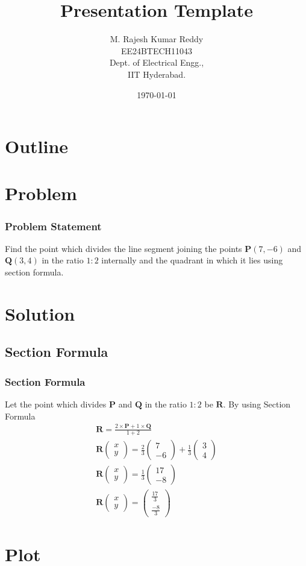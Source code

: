 \documentclass{beamer}
\title{Presentation Template}
\author{M. Rajesh Kumar Reddy\\EE24BTECH11043\\ Dept. of Electrical Engg.,\\IIT Hyderabad.}
\date{\today}
\providecommand{\brak}[1]{\ensuremath{\left(#1\right)}}
\theoremstyle{remark}
\newcommand{\myvec}[1]{\ensuremath{\begin{pmatrix}#1\end{pmatrix}}}
\let\vec\mathbf
\numberwithin{equation}{section}
\begin{document}
\begin{frame}
\titlepage
\end{frame}

\section*{Outline}
\begin{frame}
\tableofcontents
\end{frame}
\section{Problem}
\begin{frame}
\frametitle{Problem Statement}
	Find the point which divides the line segment joining the points $\vec{P}\brak{7,-6}$ and $\vec{Q}\brak{3,4}$ in the ratio $1:2$ internally and the quadrant in which it lies using section formula.
\end{frame}

\section{Solution}
\subsection{Section Formula}
\begin{frame}
\frametitle{Section Formula}
%
Let the point which divides $\vec{P}$ and $\vec{Q}$ in the ratio $1:2$ be $\vec{R}$.
%
By using Section Formula
	\begin{align}
		\vec{R} = \frac{2\times\vec{P}+1\times\vec{Q}}{1+2} \\
		\vec{R}\myvec{x\\y} = \frac{2}{3}\myvec{7\\-6} + \frac{1}{3}\myvec{3\\4} \\
		\vec{R}\myvec{x\\y} =\frac{1}{3}\myvec{17\\-8} \\
		\vec{R}\myvec{x\\y} =\myvec{\frac{17}{3}\\ \frac{-8}{3}} 
	\end{align}
\end{frame}
\section{Plot}
\end{document}
